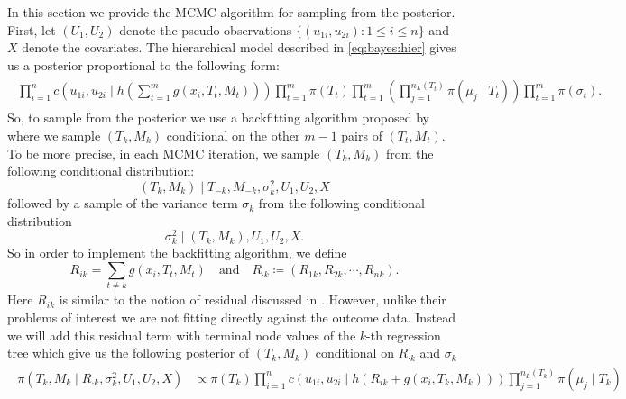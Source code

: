 \documentclass{amsart}
\begin{document}
In this section we provide the MCMC algorithm for sampling from the posterior. First, let $(U_1,U_2)$ denote the pseudo observations $\{(u_{1i},u_{2i}):1\le i \le n\}$ and $X$ denote the covariates. The hierarchical model described in \cref{eq:bayes:hier} gives us a posterior proportional to the following form:
\begin{align}
	\begin{split}
		\prod_{i=1}^{n}c\left(u_{1i},u_{2i}\mid h\left(\sum_{t=1}^m g(x_i, T_t, M_t)\right)\right)\prod_{t=1}^{m}\pi(T_t)\prod_{t=1}^{m}\left(\prod_{j=1}^{n_L(T_t)}\pi(\mu_j\mid T_t)\right)\prod_{t=1}^{m}\pi(\sigma_{t}).
	\end{split}
\end{align}
So, to sample from the posterior we use a backfitting algorithm proposed by \citet{chipman2010BART} where we sample $(T_k, M_k)$ conditional on the other $m-1$ pairs of $(T_t,M_t)$. To be more precise, in each MCMC iteration, we sample $(T_k, M_k)$ from the following conditional distribution: 
\begin{equation*}
	(T_k,M_k)\mid T_{-k},M_{-k}, \sigma^2_{k}, U_1, U_2, X
\end{equation*}
followed by a sample of the variance term $\sigma_{k}$ from the following conditional distribution
\begin{equation*}
	\sigma^2_{k} \mid (T_k,M_k),U_1,U_2,X.
\end{equation*}
So in order to implement the backfitting algorithm, we define 
\begin{equation*}
	R_{ik} = \sum_{t\not=k}g(x_i, T_t, M_t)\quad\text{and}\quad R_{\cdot k}\coloneqq(R_{1k},R_{2k},\cdots,R_{nk}).
\end{equation*}
Here $R_{ik}$ is similar to the notion of residual discussed in \citet{chipman2010BART, serafini2024lossbasedpriortreetopologies}. However, unlike their problems of interest we are not fitting directly against the outcome data. Instead we will add this residual term with terminal node values of the $k$-th regression tree which give us the following posterior of $(T_k,M_k)$ conditional on $R_{\cdot k}$ and $\sigma_{k}$
\begin{align}\label{eq:post:res}
	\begin{split}
		\pi(T_k,M_k \mid R_{\cdot k}, \sigma^2_{k}, U_1,U_2, X) &\propto \pi(T_k)\prod_{i=1}^{n}c\left(u_{1i},u_{2i}\mid h\left(R_{ik}+g(x_i, T_k, M_k)\right)\right)\prod_{j=1}^{n_L(T_k)}\pi(\mu_j\mid T_k)
	\end{split}
\end{align}
\end{document}
